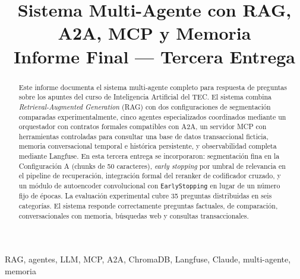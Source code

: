 \documentclass[conference]{IEEEtran}
\begin{document}
\title{Sistema Multi-Agente con RAG, A2A, MCP y Memoria\\
{\large Informe Final --- Tercera Entrega}}

\author{
   \and
}

\maketitle

\begin{abstract}
Este informe documenta el sistema multi-agente completo para respuesta de preguntas sobre los apuntes del curso de Inteligencia Artificial del TEC. El sistema combina \textit{Retrieval-Augmented Generation} (RAG) con dos configuraciones de segmentación comparadas experimentalmente, cinco agentes especializados coordinados mediante un orquestador con contratos formales compatibles con A2A, un servidor MCP con herramientas controladas para consultar una base de datos transaccional ficticia, memoria conversacional temporal e histórica persistente, y observabilidad completa mediante Langfuse. En esta tercera entrega se incorporaron: segmentación fina en la Configuración A (chunks de 50 caracteres), \textit{early stopping} por umbral de relevancia en el pipeline de recuperación, integración formal del reranker de codificador cruzado, y un módulo de autoencoder convolucional con \texttt{EarlyStopping} en lugar de un número fijo de épocas. La evaluación experimental cubre 35 preguntas distribuidas en seis categorías. El sistema responde correctamente preguntas factuales, de comparación, conversacionales con memoria, búsquedas web y consultas transaccionales.
\end{abstract}

\begin{IEEEkeywords}
RAG, agentes, LLM, MCP, A2A, ChromaDB, Langfuse, Claude, multi-agente, memoria
\end{IEEEkeywords}
\end{document}
